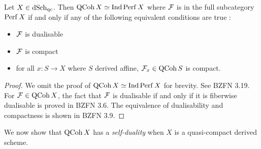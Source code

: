 \documentclass[./main.tex]{subfiles}
\begin{document}
\begin{prop}

  Let $X \in \mathrm{dSch}_\mathrm{qc}$. 
  Then $\mathrm{QCoh}\,X \simeq \mathrm{Ind}\,\mathrm{Perf}\,X$ where
  $\mathcal{F}$ is in the full subcategory $\mathrm{Perf}\,X$ if and only if
  any of the following equivalent conditions are true : 
  \begin{itemize}
    \item $\mathcal{F}$ is dualisable
    \item $\mathcal{F}$ is compact
    \item for all $x : S \to X$ where $S$ derived affine,
    $\mathcal{F}_x \in \mathrm{QCoh}\,S$ is compact.
  \end{itemize}
\end{prop}
\begin{proof}
  
  We omit the proof of $\mathrm{QCoh}\,X \simeq \mathrm{Ind}\,\mathrm{Perf}\,X$ for brevity.
  See BZFN 3.19. 
  For $\mathcal{F} \in \mathrm{QCoh}\,X$,
  the fact that $\mathcal{F}$ is dualisable if and only if
  it is fiberwise dualisable is proved in BZFN 3.6.
  The equivalence of dualisability and compactness
  is shown in BZFN 3.9.
\end{proof}

We now show that $\mathrm{QCoh}\,X$ has a \emph{self-duality} when 
$X$ is a quasi-compact derived scheme.
\end{document}
